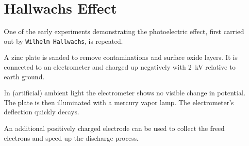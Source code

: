 \chapter{Hallwachs Effect}

One of the early experiments demonstrating the photoelectric effect, first carried out by \texttt{Wilhelm Hallwachs}, is repeated.

A zinc plate is sanded to remove contaminations and surface oxide layers.
It is connected to an electrometer and charged up negatively with \SI{2}{\kV} relative to earth ground.

In (artificial) ambient light the electrometer shows no visible change in potential.
The plate is then illuminated with a mercury vapor lamp.
The electrometer's deflection quickly decays.


An additional positively charged electrode can be used to collect the freed electrons and speed up the discharge process.
